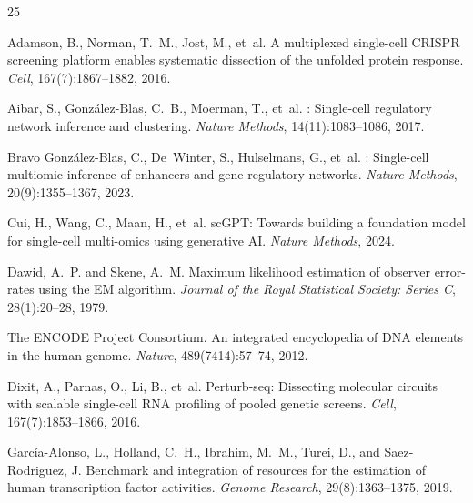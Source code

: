 \documentclass[11pt,a4paper]{article}
\begin{document}
\begin{thebibliography}{25}

Adamson, B., Norman, T.~M., Jost, M., et~al.
\newblock A multiplexed single-cell {CRISPR} screening platform enables systematic dissection of the unfolded protein response.
\newblock \emph{Cell}, 167(7):1867--1882, 2016.

Aibar, S., Gonz{\'a}lez-Blas, C.~B., Moerman, T., et~al.
: Single-cell regulatory network inference and clustering.
\newblock \emph{Nature Methods}, 14(11):1083--1086, 2017.

Bravo Gonz{\'a}lez-Blas, C., De~Winter, S., Hulselmans, G., et~al.
: Single-cell multiomic inference of enhancers and gene regulatory networks.
\newblock \emph{Nature Methods}, 20(9):1355--1367, 2023.

Cui, H., Wang, C., Maan, H., et~al.
\newblock sc{GPT}: Towards building a foundation model for single-cell multi-omics using generative {AI}.
\newblock \emph{Nature Methods}, 2024.

Dawid, A.~P. and Skene, A.~M.
\newblock Maximum likelihood estimation of observer error-rates using the {EM} algorithm.
\newblock \emph{Journal of the Royal Statistical Society: Series C}, 28(1):20--28, 1979.

The {ENCODE} Project Consortium.
\newblock An integrated encyclopedia of {DNA} elements in the human genome.
\newblock \emph{Nature}, 489(7414):57--74, 2012.

Dixit, A., Parnas, O., Li, B., et~al.
\newblock Perturb-seq: Dissecting molecular circuits with scalable single-cell {RNA} profiling of pooled genetic screens.
\newblock \emph{Cell}, 167(7):1853--1866, 2016.

Garc{\'i}a-Alonso, L., Holland, C.~H., Ibrahim, M.~M., Turei, D., and Saez-Rodriguez, J.
\newblock Benchmark and integration of resources for the estimation of human transcription factor activities.
\newblock \emph{Genome Research}, 29(8):1363--1375, 2019.


\end{thebibliography}
\end{document}
